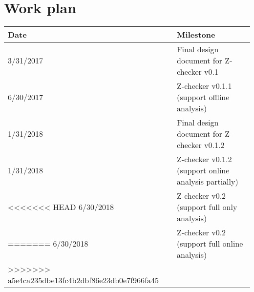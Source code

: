 \section{Work plan}

\begin{tabular}{|p{0.7in}|p{5.5in}|}\hline
\textbf{Date}  & \textbf{Milestone} \\\hline
3/31/2017 & Final design document for Z-checker v0.1 \\\hline
6/30/2017 & Z-checker v0.1.1 (support offline analysis)\\\hline
1/31/2018 & Final design document for Z-checker v0.1.2 \\\hline
1/31/2018 & Z-checker v0.1.2 (support online analysis partially)\\\hline
<<<<<<< HEAD
6/30/2018 & Z-checker v0.2 (support full only analysis) \\\hline
=======
6/30/2018 & Z-checker v0.2 (support full online analysis) \\\hline
>>>>>>> a5e4ca235dbe13fc4b2dbf86e23db0e7f966fa45
\end{tabular}

